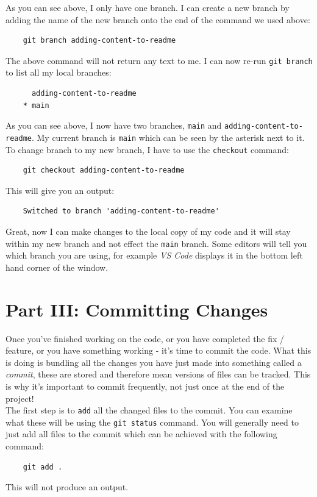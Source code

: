 \documentclass[a4paper, 11pt]{article}
\begin{document}
As you can see above, I only have one branch. I can create a new branch by adding the name of the new branch onto the end of the command we used above:
\begin{verbatim}
    git branch adding-content-to-readme
\end{verbatim}
The above command will not return any text to me. I can now re-run \verb|git branch| to list all my local branches:
\begin{verbatim}
      adding-content-to-readme
    * main
\end{verbatim}
As you can see above, I now have two branches, \verb|main| and \verb|adding-content-to-readme|. My current branch is \verb|main| which can be seen by the asterisk next to it.\\

To change branch to my new branch, I have to use the \verb|checkout| command:
\begin{verbatim}
    git checkout adding-content-to-readme
\end{verbatim}
This will give you an output:
\begin{verbatim}
    Switched to branch 'adding-content-to-readme'
\end{verbatim}

Great, now I can make changes to the local copy of my code and it will stay within my new branch and not effect the \verb|main| branch. Some editors will tell you which branch you are using, for example \textit{VS Code} displays it in the bottom left hand corner of the window.

\section{Part III: Committing Changes}
Once you've finished working on the code, or you have completed the fix / feature, or you have something working - it's time to commit the code. What this is doing is bundling all the changes you have just made into something called a \textit{commit}, these are stored and therefore mean versions of files can be tracked. This is why it's important to commit frequently, not just once at the end of the project!\\

The first step is to \verb|add| all the changed files to the commit. You can examine what these will be using the \verb|git status| command. You will generally need to just add all files to the commit which can be achieved with the following command:
\begin{verbatim}
    git add .
\end{verbatim}
This will not produce an output.\\
\end{document}
